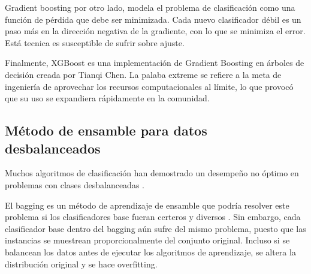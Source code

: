 Gradient boosting por otro lado, modela el problema de clasificación como una función de pérdida que debe ser minimizada. Cada nuevo clasificador débil es un paso más en la dirección negativa de la gradiente, con lo que se minimiza el error. Está tecnica es susceptible de sufrir sobre ajuste.

Finalmente, XGBoost es una implementación de Gradient Boosting en árboles de decisión creada por Tianqi Chen. La palaba extreme se refiere a la meta de ingeniería de aprovechar los recursos computacionales al límite, lo que provocó que su uso se expandiera rápidamente en la comunidad.



\subsection{Método de ensamble para datos desbalanceados}


Muchos algoritmos de clasificación han demostrado un desempeño no óptimo en problemas con clases desbalanceadas \cite{batista2004study, mani2003knn, seiffert2010rusboost}.

El bagging es un método de aprendizaje de ensamble que podría resolver este problema si los clasificadores base fueran certeros y diversos \cite{breiman1996bagging}. Sin embargo, cada clasificador base dentro del bagging aún sufre del mismo problema, puesto que las instancias se muestrean proporcionalmente del conjunto original. Incluso si se balancean los datos antes de ejecutar los algoritmos de aprendizaje, se altera la distribución original y se hace overfitting.


